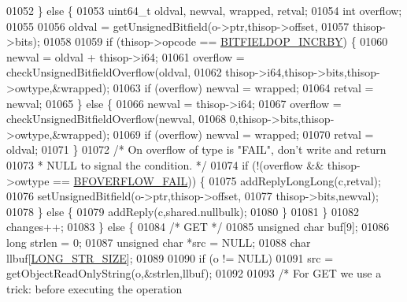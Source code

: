\begin{DoxyCode}
{01052             \} \textcolor{keywordflow}{else} \{
01053                 uint64\_t oldval, newval, wrapped, retval;
01054                 \textcolor{keywordtype}{int} overflow;
01055 
01056                 oldval = getUnsignedBitfield(o->ptr,thisop->offset,
01057                         thisop->bits);
01058 
01059                 \textcolor{keywordflow}{if} (thisop->opcode == \hyperlink{bitops_8c_aa91cdbb6feffa6f3ef145e62f0fb7706}{BITFIELDOP\_INCRBY}) \{
01060                     newval = oldval + thisop->i64;
01061                     overflow = checkUnsignedBitfieldOverflow(oldval,
01062                             thisop->i64,thisop->bits,thisop->owtype,&wrapped);
01063                     \textcolor{keywordflow}{if} (overflow) newval = wrapped;
01064                     retval = newval;
01065                 \} \textcolor{keywordflow}{else} \{
01066                     newval = thisop->i64;
01067                     overflow = checkUnsignedBitfieldOverflow(newval,
01068                             0,thisop->bits,thisop->owtype,&wrapped);
01069                     \textcolor{keywordflow}{if} (overflow) newval = wrapped;
01070                     retval = oldval;
01071                 \}
01072                 \textcolor{comment}{/* On overflow of type is "FAIL", don't write and return}
01073 \textcolor{comment}{                 * NULL to signal the condition. */}
01074                 \textcolor{keywordflow}{if} (!(overflow && thisop->owtype == \hyperlink{bitops_8c_a43973854211e7721d528708f55214302}{BFOVERFLOW\_FAIL})) \{
01075                     addReplyLongLong(c,retval);
01076                     setUnsignedBitfield(o->ptr,thisop->offset,
01077                                         thisop->bits,newval);
01078                 \} \textcolor{keywordflow}{else} \{
01079                     addReply(c,shared.nullbulk);
01080                 \}
01081             \}
01082             changes++;
01083         \} \textcolor{keywordflow}{else} \{
01084             \textcolor{comment}{/* GET */}
01085             \textcolor{keywordtype}{unsigned} \textcolor{keywordtype}{char} buf[9];
01086             \textcolor{keywordtype}{long} strlen = 0;
01087             \textcolor{keywordtype}{unsigned} \textcolor{keywordtype}{char} *src = NULL;
01088             \textcolor{keywordtype}{char} llbuf[\hyperlink{server_8h_a39ec35278876f65fc1ef70b049856ca3}{LONG\_STR\_SIZE}];
01089 
01090             \textcolor{keywordflow}{if} (o != NULL)
01091                 src = getObjectReadOnlyString(o,&strlen,llbuf);
01092 
01093             \textcolor{comment}{/* For GET we use a trick: before executing the operation}
}
\end{DoxyCode}
